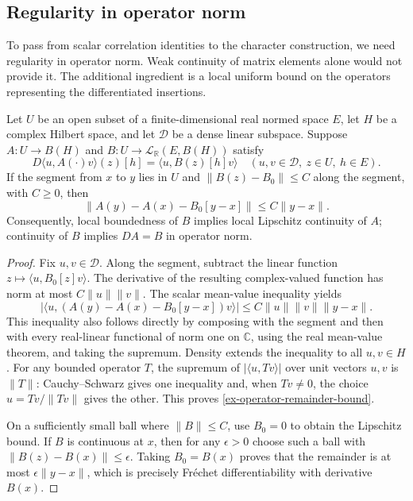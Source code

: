 \subsection{Regularity in operator norm}
\label{ex-slab-regularity}

To pass from scalar correlation identities to the character construction,
we need regularity in operator norm. Weak continuity of matrix elements
alone would not provide it. The additional ingredient is a local uniform
bound on the operators representing the differentiated insertions.

\begin{lemma}\label{ex-operator-remainder}
Let \(U\) be an open subset of a finite-dimensional real normed space
\(E\), let \(H\) be a complex Hilbert space, and let \(\mathcal D\)
be a dense linear subspace. Suppose \(A:U\to B(H)\) and
\(B:U\to\mathcal L_{\mathbb R}(E,B(H))\) satisfy
\[
 D\langle u,A(\cdot)v\rangle(z)[h]=\langle u,B(z)[h]v\rangle
 \quad(u,v\in\mathcal D,\ z\in U,\ h\in E).
\]
If the segment from \(x\) to \(y\) lies in \(U\) and
\(\|B(z)-B_0\|\le C\) along the segment, with \(C\ge0\), then
\begin{equation}\label{ex-operator-remainder-bound}
 \|A(y)-A(x)-B_0[y-x]\|\le C\|y-x\|.
\end{equation}
Consequently, local boundedness of \(B\) implies local Lipschitz
continuity of \(A\); continuity of \(B\) implies \(DA=B\) in
operator norm.
\end{lemma}
\begin{proof}
Fix \(u,v\in\mathcal D\). Along the segment, subtract the linear
function \(z\mapsto\langle u,B_0[z]v\rangle\). The derivative of
the resulting complex-valued function has norm at most
\(C\|u\|\|v\|\). The scalar mean-value inequality yields
\[
 |\langle u,(A(y)-A(x)-B_0[y-x])v\rangle|
 \le C\|u\|\|v\|\|y-x\|.
\]
This inequality also follows directly by composing with the segment and
then with every real-linear functional of norm one on \(\mathbb C\),
using the real mean-value theorem, and taking the supremum. Density
extends the inequality to all \(u,v\in H\). For any bounded operator
\(T\), the supremum of \(|\langle u,Tv\rangle|\) over unit vectors
\(u,v\) is \(\|T\|\): Cauchy--Schwarz gives one inequality and,
when \(Tv\ne0\), the choice \(u=Tv/\|Tv\|\) gives the other.
This proves \eqref{ex-operator-remainder-bound}.

On a sufficiently small ball where \(\|B\|\le C\), use \(B_0=0\)
to obtain the Lipschitz bound. If \(B\) is continuous at \(x\), then
for any \(\epsilon>0\) choose such a ball with
\(\|B(z)-B(x)\|\le\epsilon\). Taking \(B_0=B(x)\) proves that
the remainder is at most \(\epsilon\|y-x\|\), which is precisely
Fr\'echet differentiability with derivative \(B(x)\).
\end{proof}

